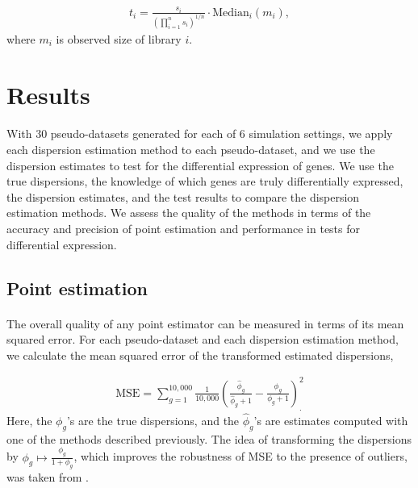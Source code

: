 \documentclass[10pt]{article}
\providecommand{\wh}[1]{\widehat{#1}}
\begin{document}
\begin{align*}
t_i = \frac{s_i}{ \left (\prod_{i = 1}^n s_i \right)^{1/n}} \cdot \text{Median}_i (m_i),
\end{align*} where $m_i$ is observed size of library $i$. 















\section*{Results}

\paragraph{} \indent With 30 pseudo-datasets generated for each of 6 simulation settings, we apply each dispersion estimation method to each pseudo-dataset, and we use the dispersion estimates to test for the differential expression of genes. We use the true dispersions, the knowledge of which genes are truly differentially expressed, the dispersion estimates, and the test results to compare the dispersion estimation methods. We assess the quality of the methods in terms of the accuracy and precision of point estimation and performance in tests for differential expression.

\subsection*{Point estimation}


\paragraph{} \indent The overall quality of any point estimator can be measured in terms of its mean squared error. For each pseudo-dataset and each dispersion estimation method, we calculate the mean squared error of the transformed estimated dispersions,

\begin{align*}
\text{MSE} = \sum_{g = 1}^{10,000} \frac{1}{10,000} \left ( \frac{\wh{\phi}_g}{\wh{\phi}_g + 1} - \frac{\phi_g}{\phi_g + 1} \right )^2_. %
\end{align*} Here, the $\phi_g$'s are the true dispersions, and the $\wh{\phi}_g$'s are estimates computed with one of the methods described previously. The idea of transforming the dispersions by $\phi_g \mapsto\frac{\phi_g}{1+\phi_g}$, which improves the robustness of MSE to the presence of outliers, was taken from \cite{rs07}.
\end{document}
